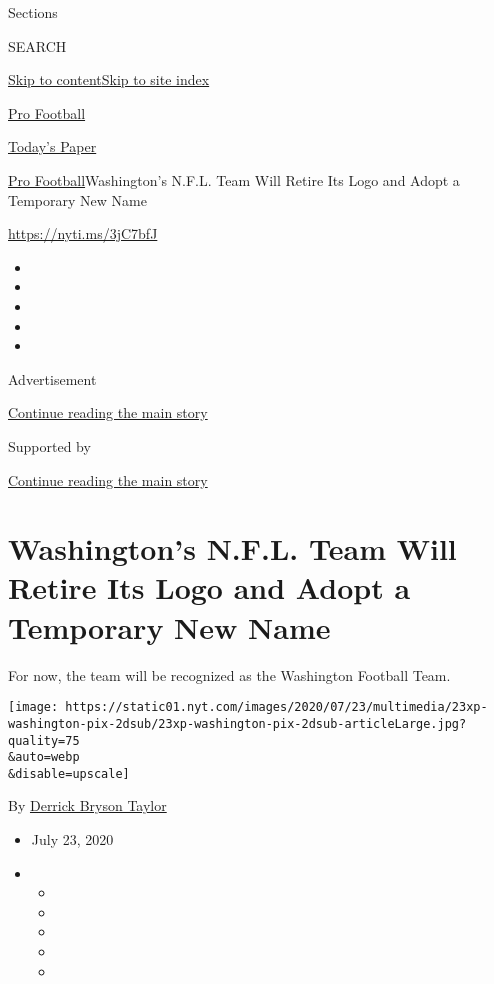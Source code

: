 Sections

SEARCH

\protect\hyperlink{site-content}{Skip to
content}\protect\hyperlink{site-index}{Skip to site index}

\href{https://www.nytimes.com/section/sports/football}{Pro Football}

\href{https://myaccount.nytimes.com/auth/login?response_type=cookie\&client_id=vi}{}

\href{https://www.nytimes.com/section/todayspaper}{Today's Paper}

\href{/section/sports/football}{Pro Football}\textbar{}Washington's
N.F.L. Team Will Retire Its Logo and Adopt a Temporary New Name

\url{https://nyti.ms/3jC7bfJ}

\begin{itemize}
\item
\item
\item
\item
\item
\end{itemize}

Advertisement

\protect\hyperlink{after-top}{Continue reading the main story}

Supported by

\protect\hyperlink{after-sponsor}{Continue reading the main story}

\hypertarget{washingtons-nfl-team-will-retire-its-logo-and-adopt-a-temporary-new-name}{%
\section{Washington's N.F.L. Team Will Retire Its Logo and Adopt a
Temporary New
Name}\label{washingtons-nfl-team-will-retire-its-logo-and-adopt-a-temporary-new-name}}

For now, the team will be recognized as the Washington Football Team.

\texttt{[image: https://static01.nyt.com/images/2020/07/23/multimedia/23xp-washington-pix-2dsub/23xp-washington-pix-2dsub-articleLarge.jpg?quality=75\\\&auto=webp\\\&disable=upscale]}

By \href{https://www.nytimes.com/by/derrick-bryson-taylor}{Derrick
Bryson Taylor}

\begin{itemize}
\item
  July 23, 2020
\item
  \begin{itemize}
  \item
  \item
  \item
  \item
  \item
  \end{itemize}
\end{itemize}

